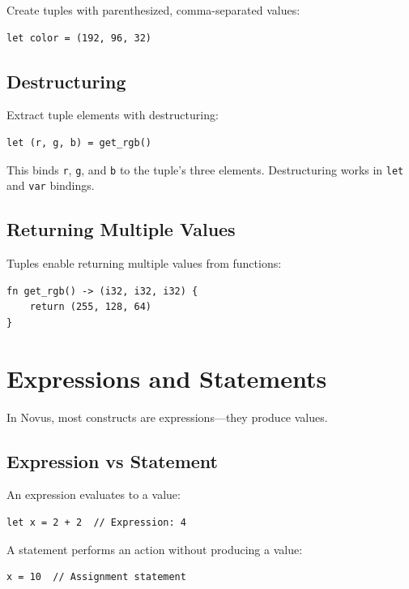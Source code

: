 Create tuples with parenthesized, comma-separated values:

\begin{lstlisting}
let color = (192, 96, 32)
\end{lstlisting}

\subsection{Destructuring}

Extract tuple elements with destructuring:

\begin{lstlisting}
let (r, g, b) = get_rgb()
\end{lstlisting}

This binds \texttt{r}, \texttt{g}, and \texttt{b} to the tuple's three elements. Destructuring works in \texttt{let} and \texttt{var} bindings.

\subsection{Returning Multiple Values}

Tuples enable returning multiple values from functions:

\begin{lstlisting}
fn get_rgb() -> (i32, i32, i32) {
    return (255, 128, 64)
}
\end{lstlisting}

\section{Expressions and Statements}

In Novus, most constructs are expressions---they produce values.

\subsection{Expression vs Statement}

An expression evaluates to a value:

\begin{lstlisting}
let x = 2 + 2  // Expression: 4
\end{lstlisting}

A statement performs an action without producing a value:

\begin{lstlisting}
x = 10  // Assignment statement
\end{lstlisting}

